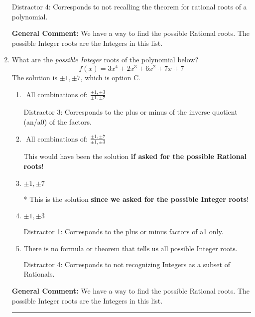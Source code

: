 \documentclass{extbook}[14pt]
\newcommand{\litem}[1]{\item #1

\rule{\textwidth}{0.4pt}}
\begin{document}
\begin{enumerate}
{\begin{enumerate}[label=\Alph*.]
 Distractor 4: Corresponds to not recalling the theorem for rational roots of a polynomial.
\end{enumerate}

\textbf{General Comment:} We have a way to find the possible Rational roots. The possible Integer roots are the Integers in this list.
}
\litem{
What are the \textit{possible Integer} roots of the polynomial below?
\[ f(x) = 3x^{4} +2 x^{3} +6 x^{2} +7 x + 7 \]The solution is \( \pm 1,\pm 7 \), which is option C.\begin{enumerate}[label=\Alph*.]
\item \( \text{ All combinations of: }\frac{\pm 1,\pm 3}{\pm 1,\pm 7} \)

 Distractor 3: Corresponds to the plus or minus of the inverse quotient (an/a0) of the factors. 
\item \( \text{ All combinations of: }\frac{\pm 1,\pm 7}{\pm 1,\pm 3} \)

This would have been the solution \textbf{if asked for the possible Rational roots}!
\item \( \pm 1,\pm 7 \)

* This is the solution \textbf{since we asked for the possible Integer roots}!
\item \( \pm 1,\pm 3 \)

 Distractor 1: Corresponds to the plus or minus factors of a1 only.
\item \( \text{There is no formula or theorem that tells us all possible Integer roots.} \)

 Distractor 4: Corresponds to not recognizing Integers as a subset of Rationals.
\end{enumerate}

\textbf{General Comment:} We have a way to find the possible Rational roots. The possible Integer roots are the Integers in this list.
}
\end{enumerate}
\end{document}
